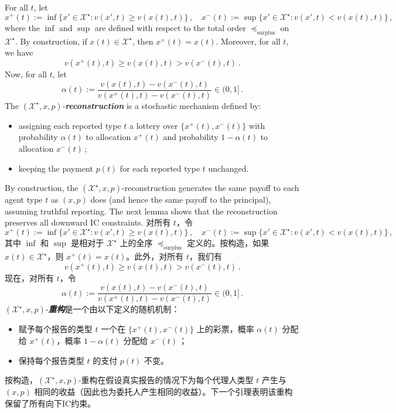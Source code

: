 \documentclass[12pt,letterpaper]{article}
\newenvironment{original}{\color{black}\noindent}{}
\newenvironment{translation}{\color{blue}\noindent}{}
\theoremstyle{plain}
\theoremstyle{definition}
\theoremstyle{remark}
\renewcommand{\1}{\mathds{1}}
\newcommand{\X}{\mathcal{X}}
\theoremstyle{definition}
\begin{document}
\begin{original}
For all $t$, let
\[x^{+}(t):= \inf\Big\{x' \in \X^\star: v(x', t) \geq v(x(t), t)\Big\}\,,\quad  x^{-}(t):= \sup\Big\{x' \in \X^\star: v(x', t) < v(x(t), t)\Big\}\,,\]
where the $\inf$ and $\sup$ are defined with respect to the total order $\preceq_{\text{surplus}}$ on $\X^\star$. By construction, if $x(t)\in \X^\star$, then $x^{+}(t) = x(t)$. Moreover, for all $t$, we have
\[v(x^{+}(t), t) \geq v(x(t), t) > v(x^{-}(t), t)\,.\]
Now, for all $t$, let
\[\alpha(t) := \frac{v(x(t), t) - v(x^{-}(t), t)}{ v(x^{+}(t), t) -  v(x^{-}(t), t)} \in (0, 1]\,.\]
The $(\X^\star, x, p)$-\textit{\textbf{reconstruction}} is a stochastic mechanism defined by:
\begin{itemize}
    \item assigning each reported type $t$ a lottery over $\{x^{+}(t), x^{-}(t)\}$ with probability $\alpha(t)$ to allocation $x^{+}(t)$ and probability  $1- \alpha(t)$ to allocation $x^{-}(t)$\,;
    \item keeping the payment $p(t)$ for each reported type $t$ unchanged.
\end{itemize}

By construction, the $(\X^\star, x, p)$-reconstruction generates the same payoff to each agent type $t$ as $(x, p)$ does (and hence the same payoff to the principal), assuming truthful reporting. The next lemma shows that the reconstruction preserves all downward IC constraints.
\end{original}
\begin{translation}
对所有 $t$，令
\[x^{+}(t):= \inf\Big\{x' \in \X^\star: v(x', t) \geq v(x(t), t)\Big\}\,,\quad  x^{-}(t):= \sup\Big\{x' \in \X^\star: v(x', t) < v(x(t), t)\Big\}\,,\]
其中 $\inf$ 和 $\sup$ 是相对于 $\X^\star$ 上的全序 $\preceq_{\text{surplus}}$ 定义的。按构造，如果 $x(t)\in \X^\star$，则 $x^{+}(t) = x(t)$。此外，对所有 $t$，我们有
\[v(x^{+}(t), t) \geq v(x(t), t) > v(x^{-}(t), t)\,.\]
现在，对所有 $t$，令
\[\alpha(t) := \frac{v(x(t), t) - v(x^{-}(t), t)}{ v(x^{+}(t), t) -  v(x^{-}(t), t)} \in (0, 1]\,.\]
$(\X^\star, x, p)$-\textit{\textbf{重构}}是一个由以下定义的随机机制：
\begin{itemize}
    \item 赋予每个报告的类型 $t$ 一个在 $\{x^{+}(t), x^{-}(t)\}$ 上的彩票，概率 $\alpha(t)$ 分配给 $x^{+}(t)$，概率 $1- \alpha(t)$ 分配给 $x^{-}(t)$\,；
    \item 保持每个报告类型 $t$ 的支付 $p(t)$ 不变。
\end{itemize}

按构造，$(\X^\star, x, p)$-重构在假设真实报告的情况下为每个代理人类型 $t$ 产生与 $(x, p)$ 相同的收益（因此也为委托人产生相同的收益）。下一个引理表明该重构保留了所有向下IC约束。
\end{translation}
\end{document}
